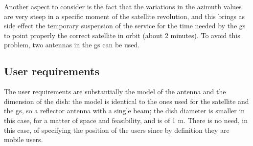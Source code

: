 	Another aspect to consider is the fact that the variations in the azimuth values are very steep in a specific moment of the satellite revolution, and this brings as side effect the temporary suspension of the service for the time needed by the \gls{gs} to point properly the correct satellite in orbit (about 2 minutes).
	To avoid this problem, two antennas in the \gls{gs} can be used.
\subsection{User requirements}
The user requirements are substantially the model of the antenna and the dimension of the dish: the model is identical to the ones used for the satellite and the \gls{gs}, so a reflector antenna with a single beam; the dish diameter is smaller in this case, for a matter of space and feasibility, and is of 1 m. There is no need, in this case, of specifying the position of the users since by definition they are mobile users.
